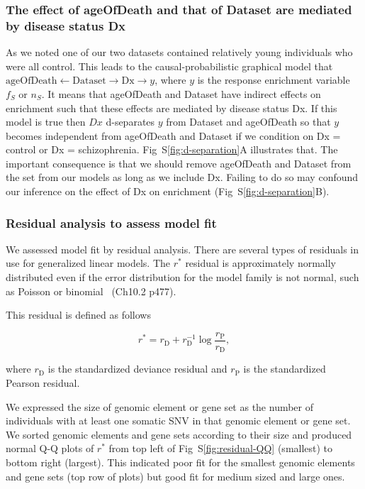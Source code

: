 \documentclass[letterpaper]{article}
\begin{document}
\subsubsection*{The effect of ageOfDeath and that of Dataset are mediated by disease status Dx}

As we noted one of our two datasets contained relatively young individuals who
were all control.  This leads to the causal-probabilistic graphical model that
\(\mathrm{ageOfDeath} \leftarrow \mathrm{Dataset} \rightarrow \mathrm{Dx}
\rightarrow y\), where \(y\) is the response enrichment variable \(f_S\) or
\(n_S\).  It means that ageOfDeath and Dataset have indirect effects on
enrichment such that these effects are mediated by disease status Dx. If this
model is true then \(Dx\) d-separates \(y\) from Dataset and ageOfDeath so
that \(y\) becomes independent from ageOfDeath and Dataset if we condition on
Dx = control or Dx = schizophrenia.  Fig~S\ref{fig:d-separation}A illustrates
that.  The important consequence is that we should remove ageOfDeath and
Dataset from the set from our models as long as we include Dx.  Failing to do
so may confound our inference on the effect of Dx on enrichment
(Fig~S\ref{fig:d-separation}B).

\subsubsection*{Residual analysis to assess model fit }

We assessed model fit by residual analysis.  There are several types of residuals in use for generalized linear models.
The $r^\ast$ residual is approximately normally distributed even if the error
distribution for the model family is not normal, such as Poisson or
binomial~\citep{davison2003statistical} (Ch10.2 p477).

This residual is defined as follows

$$
r^\ast = r_\mathrm{D} + r_\mathrm{D}^{-1} \log
\frac{r_\mathrm{P}}{r_\mathrm{D}},
$$

where \(r_\mathrm{D}\) is the standardized deviance residual and
\(r_\mathrm{P}\) is the standardized Pearson residual.

We expressed the size of genomic element or gene set as the number of
individuals with at least one somatic SNV in that genomic element or gene set.
We sorted genomic elements and gene sets according to their size and produced
normal Q-Q plots of \(r^\ast\) from top left of Fig~S\ref{fig:residual-QQ} (smallest) to
bottom right (largest).  This indicated poor fit for the smallest genomic
elements and gene sets (top row of plots) but good fit for medium sized and
large ones.
\end{document}
